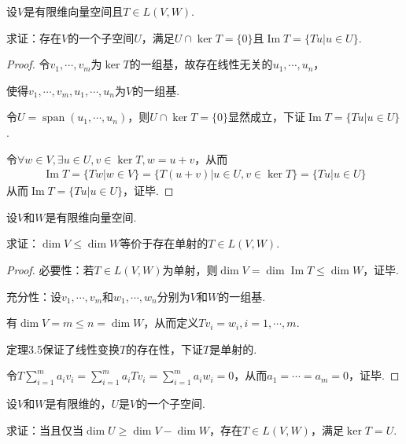 \begin{problem}[12]\label{3.B.12}
    设\(V\)是有限维向量空间且\(T\in L(V,W)\).

    求证：存在\(V\)的一个子空间\(U\)，满足\(U \cap \ker T=\{0\}\)且\(\operatorname{Im} T=\{Tu|u\in U\}\).    
\end{problem}

\begin{proof}
    令\(v_1,\cdots,v_m\)为\(\ker T\)的一组基，故存在线性无关的\(u_1,\cdots,u_n\)，

    使得\(v_1,\cdots,v_m,u_1,\cdots,u_n\)为\(V\)的一组基.
    
    令\(U=\operatorname{span} (u_1,\cdots,u_n)\)，则\(U\cap \ker T=\{0\}\)显然成立，下证\(\operatorname{Im} T=\{Tu|u\in U\}\).
    
    令\(\forall w\in V,\exists u\in U,v\in \ker T, w=u+v\)，从而
    \begin{align*}
        \operatorname{Im} T=\{Tw|w\in V\}=\{T(u+v)|u\in U,v\in \ker T\}=\{Tu|u\in U\}
    \end{align*}
    从而\(\operatorname{Im} T=\{Tu|u\in U\}\)，证毕.    
\end{proof}

\newpage

\begin{problem}[17]\label{3.B.17}
    设\(V\)和\(W\)是有限维向量空间.
    
    求证：\(\dim V \leq \dim W\)等价于存在单射的\(T\in L(V,W)\).
\end{problem}

\begin{proof}
    必要性：若\(T\in L(V,W)\)为单射，则\(\dim V=\dim \operatorname{Im} T \leq \dim W\)，证毕.
    
    充分性：设\(v_1,\cdots,v_m\)和\(w_1,\cdots,w_n\)分别为\(V\)和\(W\)的一组基.
    
    有\(\dim V=m\leq n=\dim W\)，从而定义\(Tv_i=w_i,i=1,\cdots,m\).
    
    定理3.5保证了线性变换\(T\)的存在性，下证\(T\)是单射的.
    
    令\(T\sum_{i=1}^m a_iv_i=\sum_{i=1}^m a_iTv_i=\sum_{i=1}^m a_iw_i=0\)，从而\(a_1=\cdots=a_m=0\)，证毕.    
\end{proof}

\begin{problem}[19]\label{3.B.19}
    设\(V\)和\(W\)是有限维的，\(U\)是\(V\)的一个子空间.

    求证：当且仅当\(\dim U \geq \dim V-\dim W\)，存在\(T\in L(V,W)\)，满足\(\ker T=U\).
\end{problem}

